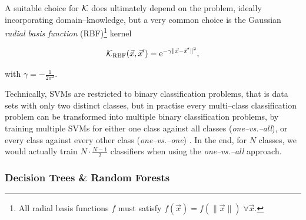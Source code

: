 A suitable choice for $\mathcal{K}$ does ultimately depend on the problem, ideally incorporating domain--knowledge, but a very common choice is the Gaussian \emph{radial basis function} (RBF)\footnote{All radial basis functions $f$ must satisfy $f(\vec x) = f(\|\vec x\|) \; \forall \vec x$.} kernel

\begin{equation}
\label{eq:rbf}
\mathcal{K}_{\text{RBF}}(\vec x, \vec x') = \mathrm{e}^{-\gamma \| \vec x - \vec x' \|^2},
\end{equation}

with $\gamma = -\frac{1}{2 \sigma^2}$.\\

Technically, SVMs are restricted to binary classification problems, that is data sets with only two distinct classes, but in practise every multi--class classification problem can be transformed into multiple binary classification problems, \eg by training multiple SVMs for either one class against all classes (\emph{one--vs.--all}), or every class against every other class (\emph{one--vs.--one}) \citep{knerr1990}. In the end, for $N$ classes, we would actually train $N \cdot \frac{N-1}{2}$ classifiers when using the \emph{one--vs.--all} approach.


\subsubsection{Decision Trees \& Random Forests}

